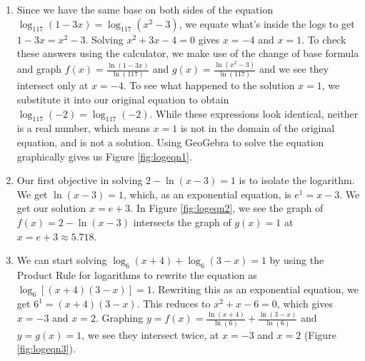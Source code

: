 {
\begin{enumerate}

\item  Since we have the same base on both sides of the equation $\log_{117}(1-3x) = \log_{117}\left(x^2-3\right)$, we equate what's inside the logs to get $1-3x = x^2-3$.  Solving $x^2+3x-4 = 0$ gives $x=-4$ and $x=1$. To check these answers using the calculator, we make use of the change of base formula and graph $f(x) = \frac{\ln(1-3x)}{\ln(117)}$ and $g(x) = \frac{\ln\left(x^2-3\right)}{\ln(117)}$ and we see they intersect only at $x=-4$.  To see what happened to the solution $x=1$, we substitute it into our original equation to obtain  $\log_{117}(-2) =  \log_{117}(-2)$.  While these expressions look identical, neither is a real number, which means $x=1$ is not in the domain of the original equation, and is not a solution. Using GeoGebra to solve the equation graphically gives us Figure \ref{fig:logeqn1}.

{}

\item  Our first objective in solving $2 - \ln(x-3) = 1$ is to isolate the logarithm.  We get $\ln(x-3)=1$, which, as an exponential equation, is $e^{1} = x-3$.  We get our solution $x=e+3$. In Figure \ref{fig:logeqn2}, we see the graph of $f(x) = 2 - \ln(x-3)$ intersects  the graph of $g(x) = 1$ at $x = e+3 \approx 5.718$.

{}


\item We can start solving $\log_{6}(x+4) + \log_{6}(3-x) = 1$ by using the Product Rule for logarithms to rewrite the equation as  $\log_{6}\left[(x+4)(3-x)\right] = 1$.  Rewriting this as an exponential equation, we get $6^{1} = (x+4)(3-x)$.  This reduces to $x^2+x-6 = 0$, which gives $x=-3$ and $x=2$.   Graphing $y=f(x) =  \frac{\ln(x+4)}{\ln(6)} + \frac{\ln(3-x)}{\ln(6)}$ and $y=g(x) = 1$, we see they intersect twice, at $x=-3$ and $x=2$ (Figure \ref{fig:logeqn3}).


\end{enumerate}}
